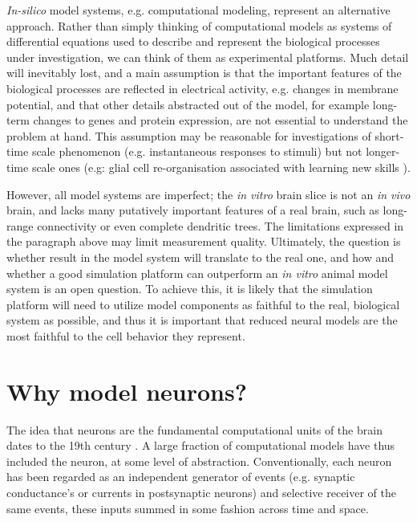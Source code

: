 \emph{In-silico} model systems, e.g. computational modeling, represent an alternative approach.
Rather than simply thinking of computational models as systems of differential equations used to describe and represent the biological processes under investigation, we can think of them as experimental platforms.
Much detail will inevitably lost, and a main assumption is that the important features of the biological processes are reflected in electrical activity, e.g. changes in membrane potential, and that other details abstracted out of the model, for example long-term changes to genes and protein expression, are not essential to understand the problem at hand.
This assumption may be reasonable for investigations of short-time scale phenomenon (e.g. instantaneous responses to stimuli) but not longer-time scale ones (e.g: glial cell re-organisation associated with learning new skills \cite{draganski2008training}).

However, all model systems are imperfect; the \emph{in vitro} brain slice is not an \emph{in vivo} brain, and lacks many putatively important features of a real brain, such as long-range connectivity or even complete dendritic trees.
The limitations expressed in the paragraph above may limit measurement quality.
Ultimately, the question is whether result in the model system will translate to the real one, and how and whether a good simulation platform can outperform an \emph{in vitro} animal model system is an open question.
To achieve this, it is likely that the simulation platform will need to utilize model components as faithful to the real, biological system as possible, and thus it is important that reduced neural models are the most faithful to the cell behavior they represent. 

\section{Why model neurons?}
The idea that neurons are the fundamental computational units of the brain dates to the 19th century \cite{shepherd2015foundations} \cite{jones1999golgi}.
A large fraction of computational models have thus included the neuron, at some level of abstraction.  
Conventionally, each neuron has been regarded as an independent generator of events (e.g. synaptic conductance's or currents in postsynaptic neurons) and selective receiver of the same events, these inputs summed in some fashion across time and space. 

